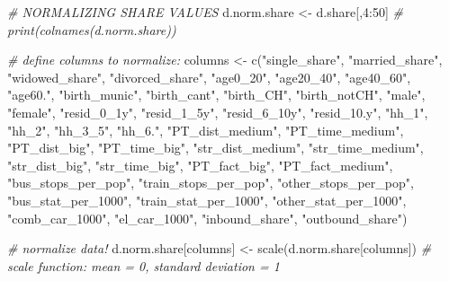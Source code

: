 \documentclass[
]{article}
\newenvironment{Shaded}{\begin{snugshade}}{\end{snugshade}}
\newcommand{\CommentTok}[1]{\textcolor[rgb]{0.56,0.35,0.01}{\textit{#1}}}
\newcommand{\DecValTok}[1]{\textcolor[rgb]{0.00,0.00,0.81}{#1}}
\newcommand{\FunctionTok}[1]{\textcolor[rgb]{0.00,0.00,0.00}{#1}}
\newcommand{\NormalTok}[1]{#1}
\newcommand{\OtherTok}[1]{\textcolor[rgb]{0.56,0.35,0.01}{#1}}
\newcommand{\SpecialCharTok}[1]{\textcolor[rgb]{0.00,0.00,0.00}{#1}}
\newcommand{\StringTok}[1]{\textcolor[rgb]{0.31,0.60,0.02}{#1}}
\begin{document}
\begin{Shaded}
\begin{Highlighting}[]
\CommentTok{\# NORMALIZING SHARE VALUES}
\NormalTok{d.norm.share }\OtherTok{\textless{}{-}}\NormalTok{ d.share[,}\DecValTok{4}\SpecialCharTok{:}\DecValTok{50}\NormalTok{]}
\CommentTok{\# print(colnames(d.norm.share))}

\CommentTok{\# define columns to normalize:}
\NormalTok{columns }\OtherTok{\textless{}{-}} \FunctionTok{c}\NormalTok{(}\StringTok{"single\_share"}\NormalTok{, }\StringTok{"married\_share"}\NormalTok{,}
             \StringTok{"widowed\_share"}\NormalTok{, }\StringTok{"divorced\_share"}\NormalTok{, }\StringTok{"age0\_20"}\NormalTok{, }\StringTok{"age20\_40"}\NormalTok{, }\StringTok{"age40\_60"}\NormalTok{, }
             \StringTok{"age60."}\NormalTok{, }\StringTok{"birth\_munic"}\NormalTok{, }\StringTok{"birth\_cant"}\NormalTok{, }\StringTok{"birth\_CH"}\NormalTok{, }\StringTok{"birth\_notCH"}\NormalTok{, }
             \StringTok{"male"}\NormalTok{, }\StringTok{"female"}\NormalTok{, }\StringTok{"resid\_0\_1y"}\NormalTok{, }\StringTok{"resid\_1\_5y"}\NormalTok{, }\StringTok{"resid\_6\_10y"}\NormalTok{, }\StringTok{"resid\_10.y"}\NormalTok{,}
             \StringTok{"hh\_1"}\NormalTok{, }\StringTok{"hh\_2"}\NormalTok{, }\StringTok{"hh\_3\_5"}\NormalTok{, }\StringTok{"hh\_6."}\NormalTok{, }\StringTok{"PT\_dist\_medium"}\NormalTok{, }\StringTok{"PT\_time\_medium"}\NormalTok{, }
             \StringTok{"PT\_dist\_big"}\NormalTok{, }\StringTok{"PT\_time\_big"}\NormalTok{, }\StringTok{"str\_dist\_medium"}\NormalTok{, }\StringTok{"str\_time\_medium"}\NormalTok{, }
             \StringTok{"str\_dist\_big"}\NormalTok{, }\StringTok{"str\_time\_big"}\NormalTok{, }\StringTok{"PT\_fact\_big"}\NormalTok{, }\StringTok{"PT\_fact\_medium"}\NormalTok{,}
             \StringTok{"bus\_stops\_per\_pop"}\NormalTok{, }\StringTok{"train\_stops\_per\_pop"}\NormalTok{, }\StringTok{"other\_stops\_per\_pop"}\NormalTok{,}
             \StringTok{"bus\_stat\_per\_1000"}\NormalTok{, }\StringTok{"train\_stat\_per\_1000"}\NormalTok{, }\StringTok{"other\_stat\_per\_1000"}\NormalTok{,}
             \StringTok{"comb\_car\_1000"}\NormalTok{, }\StringTok{"el\_car\_1000"}\NormalTok{, }\StringTok{"inbound\_share"}\NormalTok{, }\StringTok{"outbound\_share"}\NormalTok{)}

\CommentTok{\# normalize data!}
\NormalTok{d.norm.share[columns] }\OtherTok{\textless{}{-}} \FunctionTok{scale}\NormalTok{(d.norm.share[columns]) }
  \CommentTok{\# scale function: mean = 0, standard deviation = 1}
\end{Highlighting}
\end{Shaded}
\end{document}

